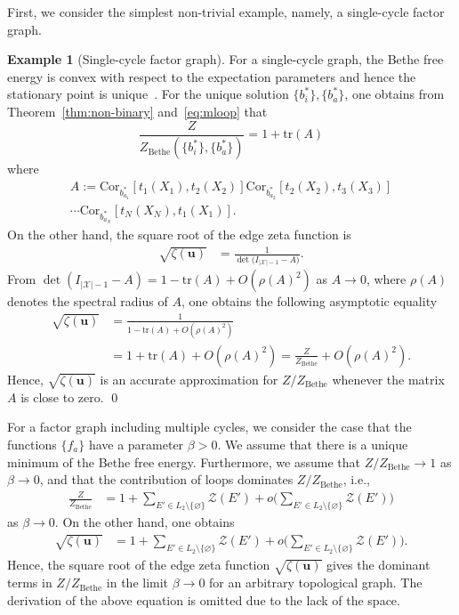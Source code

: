 \documentclass[a4paper,10pt,twoside,twocolumn,openany,final]{memoir}
\newcommand{\Cor}{\mathrm{Cor}}
\theoremstyle{plain}
\theoremstyle{definition}
\newtheorem{example}[theorem]{Example}
\theoremstyle{remark}
\begin{document}
First, we consider the simplest non-trivial example, namely, a single-cycle factor graph.
\begin{example}[Single-cycle factor graph]
For a single-cycle graph, the Bethe free energy is convex with respect to the expectation parameters
and hence the stationary point is unique~\cite{watanabe2010thesis}.
For the unique solution $\{b^*_i\}, \{b^*_a\}$, one obtains from Theorem~\ref{thm:non-binary} and~\eqref{eq:mloop} that
\begin{equation*}
\frac{Z}{Z_\mathrm{Bethe}(\{b^*_i\}, \{b^*_a\})} = 1+
\mathrm{tr}(A)
\end{equation*}
where
\begin{align*}
A:=
\Cor_{b^*_{a_1}}[t_1(X_1), t_2(X_2)]
\Cor_{b^*_{a_2}}[t_2(X_2), t_3(X_3)]\\
\dotsm
\Cor_{b^*_{a_N}}[t_N(X_N), t_1(X_1)].
\end{align*}
On the other hand, the square root of the edge zeta function is
\begin{align*}
\sqrt{\zeta(\bm{u})}
&= 
\frac1{\det\big(I_{|\mathcal{X}|-1}- A\big)}.
\end{align*}
From $\det(I_{|\mathcal{X}|-1}-A)=1-\mathrm{tr}(A) + O(\rho(A)^2)$ as $A\to 0$,
where $\rho(A)$ denotes the spectral radius of $A$, 
one obtains the following asymptotic equality
\begin{align*}
\sqrt{\zeta(\bm{u})}
&=
\frac1{1-\mathrm{tr}(A) + O(\rho(A)^2)}\\
&=
1+\mathrm{tr}(A)+ O(\rho(A)^2)
=\frac{Z}{Z_\mathrm{Bethe}}+ O(\rho(A)^2).
\end{align*}
Hence, $\sqrt{\zeta(\bm{u})}$ is an accurate approximation for $Z/Z_\mathrm{Bethe}$
whenever the matrix $A$ is close to zero. 
\hfill\qed
\end{example}
For a factor graph including multiple cycles,
we consider the case that the functions $\{f_a\}$ have a parameter $\beta>0$.
We assume that there is a unique minimum of the Bethe free energy.  
Furthermore, we assume that $Z/Z_\mathrm{Bethe}\to 1$ as $\beta\to 0$, and that
the contribution of loops dominates $Z/Z_\mathrm{Bethe}$, i.e.,
\begin{align}
\frac{Z}{Z_\mathrm{Bethe}}
&= 1 + \sum_{E'\in L_2\setminus \{\varnothing\}} \mathcal{Z}(E')
+ o\bigg(\sum_{E'\in L_2\setminus \{\varnothing\}} \mathcal{Z}(E')\bigg)
\label{eq:asm}
\end{align}
as $\beta\to 0$.
On the other hand, one obtains
\begin{align*}
\sqrt{\zeta(\bm{u})}
&= 1 + \sum_{E'\in L_2\setminus \{\varnothing\}} \mathcal{Z}(E')
+ o\bigg(\sum_{E'\in L_2\setminus \{\varnothing\}} \mathcal{Z}(E')\bigg).
\end{align*}
Hence, the square root of the edge zeta function $\sqrt{\zeta(\bm{u})}$ gives the dominant terms in $Z/Z_\mathrm{Bethe}$
in the limit $\beta\to 0$ for an arbitrary topological graph.
The derivation of the above equation is omitted due to the lack of the space.
\end{document}
